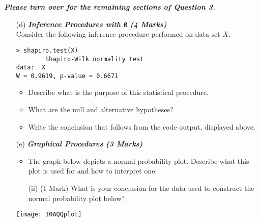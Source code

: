 {
\normalsize
\textit{\textbf{Please turn over for the remaining sections of Question 3.}}
}
%
\newpage
\begin{itemize}
\item[(d)] \textbf{\textit{ Inference Procedures with \texttt{R} (4 Marks)}}\\
Consider the following inference procedure performed on data set $X$.
\begin{center}
\begin{framed}
\begin{verbatim}
> shapiro.test(X)
        Shapiro-Wilk normality test
data:  X
W = 0.9619, p-value = 0.6671
\end{verbatim}
\end{framed}
\end{center}

\begin{itemize}
\item  Describe what is the purpose of this statistical procedure.
\item  What are the null and alternative hypotheses?
\item  Write the conclusion that follows from the code output, displayed above.
\end{itemize}
\end{itemize}

\begin{itemize}
\item[(e)] \textbf{\textit{Graphical Procedures (3 Marks)}}
\begin{itemize}
\item  The graph below depicts a normal probability plot. Describe what this plot is used for and how to interpret one.
\item[(ii)](1 Mark) What is your conclusion for the data used to construct the normal probability plot below?
\end{itemize}
\begin{center}
\texttt{[image: 10AQQplot]}
\end{center}
\end{itemize}
%

